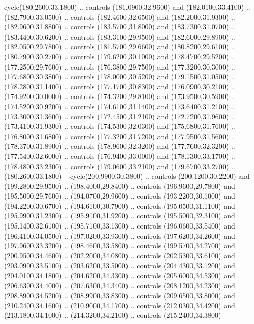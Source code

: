 {\begin{scope}[y=0.80pt, x=0.80pt, yscale=-1, xscale=1, inner sep=0pt, outer sep=0pt, #1]
      cycle(180.2600,33.1800) .. controls (181.0900,32.9600) and (182.0100,33.4100)
      .. (182.7900,33.0500) .. controls (182.4600,32.6500) and (182.2000,31.9300) ..
      (182.9600,31.8800) .. controls (183.5700,31.8000) and (183.7300,31.0700) ..
      (183.4400,30.6200) .. controls (183.3100,29.9500) and (182.6000,29.8900) ..
      (182.0500,29.7800) .. controls (181.5700,29.6600) and (180.8200,29.6100) ..
      (180.7900,30.2700) .. controls (179.6200,30.1000) and (178.4700,29.5200) ..
      (177.2500,29.7600) .. controls (176.3800,29.7500) and (177.3200,30.3000) ..
      (177.6800,30.3800) .. controls (178.0000,30.5200) and (179.1500,31.0500) ..
      (178.2800,31.1400) .. controls (177.1700,30.8300) and (176.0900,30.2100) ..
      (174.9200,30.0000) .. controls (174.3200,29.8100) and (173.9500,30.5900) ..
      (174.5200,30.9200) .. controls (174.6100,31.1400) and (173.6400,31.2100) ..
      (173.3000,31.3600) .. controls (172.4500,31.2100) and (172.7200,31.9600) ..
      (173.4100,31.9300) .. controls (174.5300,32.0300) and (175.6800,31.7600) ..
      (176.8000,31.6800) .. controls (177.3200,31.7200) and (177.9500,31.5600) ..
      (178.3700,31.8900) .. controls (178.9600,32.3200) and (177.7600,32.3200) ..
      (177.5400,32.6000) .. controls (176.9400,33.0000) and (178.1300,33.1700) ..
      (178.4800,33.2300) .. controls (179.0600,33.2100) and (179.6700,33.2700) ..
      (180.2600,33.1800) -- cycle(200.9900,30.3800) .. controls (200.1200,30.2200)
      and (199.2800,29.9500) .. (198.4000,29.8400) .. controls (196.9600,29.7800)
      and (195.5000,29.7600) .. (194.0700,29.9600) .. controls (193.2200,30.1000)
      and (194.2200,30.6700) .. (194.6100,30.7900) .. controls (195.0500,31.1100)
      and (195.9900,31.2300) .. (195.9100,31.9200) .. controls (195.5000,32.3100)
      and (195.1400,32.6100) .. (195.7100,33.1300) .. controls (196.0600,33.5400)
      and (196.4100,34.0500) .. (197.0200,33.9300) .. controls (197.6200,34.2600)
      and (197.9600,33.3200) .. (198.4600,33.5800) .. controls (199.5700,34.2700)
      and (200.9500,34.4600) .. (202.2000,34.0800) .. controls (202.5300,33.6100)
      and (203.0900,33.5100) .. (203.6200,33.5000) .. controls (204.4300,33.1200)
      and (204.0100,34.1800) .. (204.6200,34.3300) .. controls (205.6000,34.5300)
      and (206.6300,34.4000) .. (207.6300,34.3400) .. controls (208.1200,34.2300)
      and (208.8900,34.5200) .. (208.9900,33.8300) .. controls (209.6500,33.8000)
      and (210.2400,34.1600) .. (210.9000,34.1700) .. controls (212.0300,34.4200)
      and (213.1800,34.1000) .. (214.3200,34.2100) .. controls (215.2400,34.3800)

\end{scope}}
